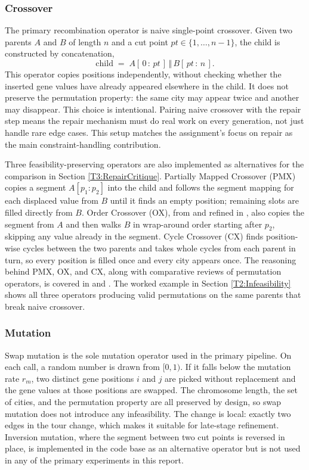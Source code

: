 \subsubsection{Crossover}
\label{T2:Crossover}
The primary recombination operator is naive single-point crossover.
Given two parents $A$ and $B$ of length $n$ and a cut point
$pt \in \{1, \ldots, n-1\}$, the child is constructed by concatenation,
\begin{equation}
\mathrm{child} \;=\; A[\,0\,{:}\,pt\,] \,\Vert\, B[\,pt\,{:}\,n\,].
\end{equation}
This operator copies positions independently, without checking whether the
inserted gene values have already appeared elsewhere in the child. It does
not preserve the permutation property: the same city may appear twice and
another may disappear. This choice is intentional. Pairing naive crossover
with the repair step means the repair mechanism must do real work on every
generation, not just handle rare edge cases. This setup matches the
assignment's focus on repair as the main constraint-handling contribution.

Three feasibility-preserving operators are also implemented as
alternatives for the comparison in Section \ref{T3:RepairCritique}.
Partially Mapped Crossover (PMX) \cite{goldberg1985alleles} copies a
segment $A[p_1{:}p_2]$ into the child and follows the segment mapping for
each displaced value from $B$ until it finds an empty position; remaining
slots are filled directly from $B$. Order Crossover (OX),
from \cite{davis1985applying} and refined in \cite{oliver1987study}, also
copies the segment from $A$ and then walks $B$ in wrap-around order
starting after $p_2$, skipping any value already in the segment. Cycle
Crossover (CX) finds position-wise cycles between the two parents and
takes whole cycles from each parent in turn, so every position is
filled once and every city appears once. The reasoning behind PMX, OX,
and CX, along with comparative reviews of permutation operators, is
covered in \cite{larranaga1999genetic} and
\cite{cicirello2023permutationoperators}. The worked example in Section
\ref{T2:Infeasibility} shows all three operators producing valid
permutations on the same parents that break naive crossover.

\subsubsection{Mutation}
\label{T2:Mutation}
Swap mutation is the sole mutation operator used in the primary pipeline.
On each call, a random number is drawn from $[0,1)$. If it falls
below the mutation rate $r_m$, two distinct gene positions $i$ and $j$ are
picked without replacement and the gene values at those positions are
swapped. The chromosome length, the set of cities, and the permutation
property are all preserved by design, so swap mutation does not introduce
any infeasibility. The change is local: exactly two edges in
the tour change, which makes it suitable for late-stage refinement.
Inversion mutation, where the segment between two cut points is
reversed in place, is implemented in the code base as an alternative
operator but is not used in any of the primary experiments in this report.

